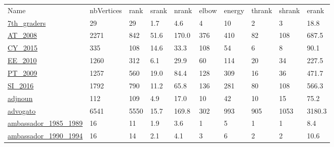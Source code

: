 \begin{longtable}{llllllllll}
\hline
 Name                                                                                                                       & nbVertices & rank  & srank  & nrank  & elbow & energy & thrank & shrank & erank   \\
 \href{https://manliodedomenico.com/data.php}{7th\_graders}                                                                  & 29         & 29    & 1.7    & 4.6    & 4     & 10     & 2      & 3      & 18.8    \\
 \href{https://doi.org/10.1007/s41060-019-00204-1}{AT\_2008}                                                                 & 2271       & 842   & 51.6   & 170.0  & 376   & 410    & 82     & 108    & 687.5   \\
 \href{https://doi.org/10.1007/s41060-019-00204-1}{CY\_2015}                                                                 & 335        & 108   & 14.6   & 33.3   & 108   & 54     & 6      & 8      & 90.1    \\
 \href{https://doi.org/10.1007/s41060-019-00204-1}{EE\_2010}                                                                 & 1260       & 312   & 6.1    & 29.9   & 60    & 114    & 20     & 34     & 227.5   \\
 \href{https://doi.org/10.1007/s41060-019-00204-1}{PT\_2009}                                                                 & 1257       & 560   & 19.0   & 84.4   & 128   & 309    & 16     & 36     & 471.7   \\
 \href{https://doi.org/10.1007/s41060-019-00204-1}{SI\_2016}                                                                 & 1792       & 790   & 11.2   & 65.8   & 136   & 281    & 80     & 108    & 566.3   \\
 \href{http://www-personal.umich.edu/~mejn/netdata/adjnoun.zip}{adjnoun}                                                    & 112        & 109   & 4.9    & 17.0   & 10    & 42     & 10     & 15     & 75.2    \\
 \href{http://konect.cc/networks/advogato}{advogato}                                                                        & 6541       & 5550  & 15.7   & 169.8  & 302   & 993    & 905    & 1053   & 3180.3  \\
 \href{https://sites.google.com/site/ucinetsoftware/datasets/covert-networks/philippinesbombing}{ambassador\_1985\_1989}      & 16         & 11    & 1.9    & 3.6    & 1     & 5      & 1      & 1      & 8.4     \\
 \href{https://sites.google.com/site/ucinetsoftware/datasets/covert-networks/philippinesbombing}{ambassador\_1990\_1994}      & 16         & 14    & 2.1    & 4.1    & 3     & 6      & 2      & 2      & 10.6    \\

\end{longtable}
